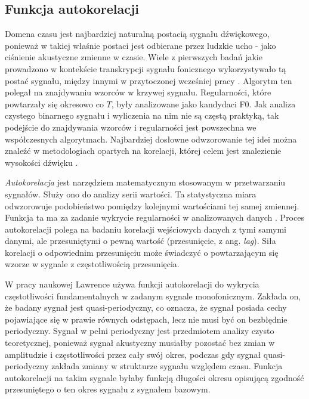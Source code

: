 \documentclass[12pt,a4paper,twoside]{mwart}
\begin{document}
\subsection{Funkcja autokorelacji}\label{sec:f0:ac}
Domena czasu jest najbardziej naturalną postacią sygnału dźwiękowego, ponieważ w takiej właśnie postaci jest odbierane przez ludzkie ucho - jako ciśnienie akustyczne zmienne w czasie. Wiele z pierwszych badań jakie prowadzono w kontekście transkrypcji sygnału fonicznego wykorzystywało tą postać sygnału, między innymi w przytoczonej wcześniej pracy \cite{Transcription:Gold:ComputerProgramForPitchExtraction}. Algorytm ten polegał na znajdywaniu wzorców w krzywej sygnału. Regularności, które powtarzały się okresowo co $T$, były analizowane jako kandydaci F0. Jak analiza czystego binarnego sygnału i wyliczenia na nim nie są częstą praktyką, tak podejście do znajdywania wzorców i regularności jest powszechna we współczesnych algorytmach. Najbardziej dosłowne odwzorowanie tej idei można znaleźć w metodologiach opartych na korelacji, której celem jest znalezienie wysokości dźwięku 
\cite[41-44]{Transcription:Quenneville:Thesis}
.

\textit{Autokorelacja} jest narzędziem matematycznym stosowanym w przetwarzaniu sygnałów. Służy ono do analizy serii wartości. Ta statystyczna miara odwzorowuje podobieństwo pomiędzy kolejnymi wartościami tej samej zmiennej. Funkcja ta ma za zadanie wykrycie regularności w analizowanych danych 
\cite[14-17]{CyfrowePrzetwarzanieSygnalowOdTeoriiDoZastosowan}
. Proces autokorelacji polega na badaniu korelacji wejściowych danych z tymi samymi danymi, ale przesuniętymi o pewną wartość (przesunięcie, z ang. \textit{lag}). Siła korelacji o odpowiednim przesunięciu może świadczyć o powtarzającym się wzorze w sygnale z częstotliwością przesunięcia.

W pracy naukowej \cite{Transcription:Lawrence:AutocorrelationForPitchDetection} Lawrence używa funkcji autokorelacji do wykrycia częstotliwości fundamentalnych w zadanym sygnale monofonicznym. Zakłada on, że badany sygnał jest quasi-periodyczny, co oznacza, że sygnał posiada cechy pojawiające się w prawie równych odstępach, lecz nie musi być on bezbłędnie periodyczny. Sygnał w pełni periodyczny jest przedmiotem analizy czysto teoretycznej, ponieważ sygnał akustyczny musiałby pozostać bez zmian w amplitudzie i częstotliwości przez cały swój okres, podczas gdy sygnał quasi-periodyczny zakłada zmiany w strukturze sygnału względem czasu. Funkcja autokorelacji na takim sygnale byłaby funkcją długości okresu opisującą zgodność przesuniętego o ten okres sygnału z sygnałem bazowym. 
\end{document}
